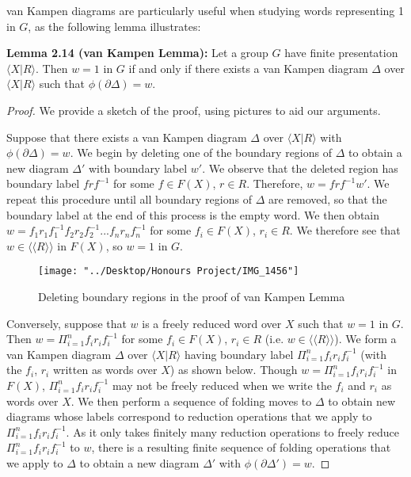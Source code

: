 \documentclass[12pt]{article}
\newcommand{\vs}{\vskip10pt}
\begin{document}
	van Kampen diagrams are particularly useful when studying words representing 1 in $G$, as the following lemma illustrates: 
	
	\vs 
	
	\textbf{Lemma 2.14 (van Kampen Lemma):} Let a group $G$ have finite presentation $\langle X \vert R \rangle$. Then $w = 1$ in $G$ if and only if there exists a van Kampen diagram $\Delta$ over $\langle X \vert R \rangle$ such that $\phi(\partial \Delta) = w$.
	
	\begin{proof}
		
		We provide a sketch of the proof, using pictures to aid our arguments. 
		
		\vs
		
		Suppose that there exists a van Kampen diagram $\Delta$ over $\langle X \vert R \rangle$ with $\phi(\partial \Delta) = w$. We begin by deleting one of the boundary regions of $\Delta$ to obtain a new diagram $\Delta'$ with boundary label $w'$. We observe that the deleted region has boundary label $frf^{-1}$ for some $f \in F(X)$, $r \in R$. Therefore, $w = frf^{-1} w'$. We repeat this procedure until all boundary regions of $\Delta$ are removed, so that the boundary label at the end of this process is the empty word. We then obtain $w = f_1 r_1 f_1^{-1} f_2 r_2 f_2^{-1}...f_n r_n f_n^{-1}$ for some $f_i \in F(X)$, $r_i \in R$. We therefore see that $w \in \langle \langle R \rangle \rangle$ in $F(X)$, so $w = 1$ in $G$. 
		
\begin{figure} [H]
	\centering
	\texttt{[image: "../Desktop/Honours Project/IMG\_1456"]}
	\caption{Deleting boundary regions in the proof of van Kampen Lemma}
	\label{fig:img1456}
\end{figure}
		
		\vs 
		
		Conversely, suppose that $w$ is a freely reduced word over $X$ such that $w = 1$ in $G$. Then $w = \Pi_{i=1}^n f_i r_i f_i^{-1}$ for some $f_i \in F(X)$, $r_i \in R$ (i.e. $w \in \langle \langle R \rangle \rangle$). We form a van Kampen diagram $\Delta$ over $\langle X \vert R \rangle$ having boundary label $\Pi_{i=1}^n f_i r_i f_i^{-1}$ (with the $f_i$, $r_i$ written as words over $X$) as shown below. Though $w = \Pi_{i=1}^n f_i r_i f_i^{-1}$ in $F(X)$, $\Pi_{i=1}^n f_i r_i f_i^{-1}$ may not be freely reduced when we write the $f_i$ and $r_i$ as words over $X$. We then perform a sequence of folding moves to $\Delta$ to obtain new diagrams whose labels correspond to reduction operations that we apply to $\Pi_{i=1}^n f_i r_i f_i^{-1}$. As it only takes finitely many reduction operations to freely reduce $\Pi_{i=1}^n f_i r_i f_i^{-1}$ to $w$, there is a resulting finite sequence of folding operations that we apply to $\Delta$ to obtain a new diagram $\Delta'$ with $\phi(\partial \Delta') = w$. 
		

\end{proof}
\end{document}

